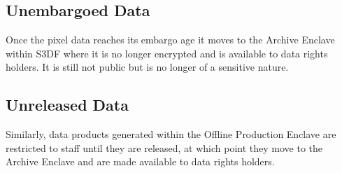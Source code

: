 \subsection{Unembargoed Data}
Once the pixel data reaches its embargo age it moves to the Archive Enclave within \gls{S3DF} where it is no longer encrypted and is available to data rights holders. It is still not public but is no longer of a sensitive nature.

\subsection{Unreleased Data}
Similarly, data products generated within the Offline Production \gls{Enclave} are restricted to staff until they are released, at which point they move to the Archive \gls{Enclave} and are made available to data rights holders.
